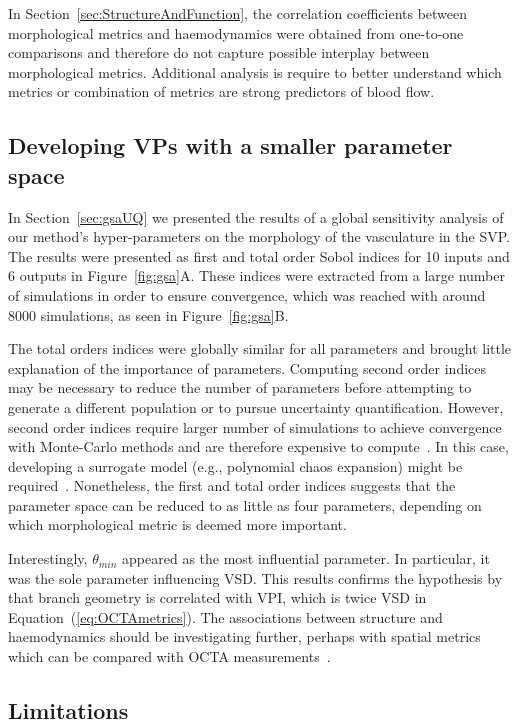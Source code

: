 \documentclass[11pt,]{article}
\begin{document}
In Section~\ref{sec:StructureAndFunction}, the correlation coefficients between morphological metrics and haemodynamics were obtained from one-to-one comparisons and therefore do not capture possible interplay between morphological metrics.
Additional analysis is require to better understand which metrics or combination of metrics are strong predictors of blood flow.

\subsection{Developing VPs with a smaller parameter space}\label{sec:disc-gsa}

In Section~\ref{sec:gsaUQ} we presented the results of a global sensitivity analysis of our method's hyper-parameters on the morphology of the vasculature in the SVP.
The results were presented as first and total order Sobol indices for 10 inputs and 6 outputs in Figure~\ref{fig:gsa}A.
These indices were extracted from a large number of simulations in order to ensure convergence, which was reached with around \SI{8000}{} simulations, as seen in Figure~\ref{fig:gsa}B.

The total orders indices were globally similar for all parameters and brought little explanation of the importance of parameters.
Computing second order indices may be necessary to reduce the number of parameters before attempting to generate a different population or to pursue uncertainty quantification.
However, second order indices require larger number of simulations to achieve convergence with Monte-Carlo methods and are therefore expensive to compute~\cite{Saltelli2008}.
In this case, developing a surrogate model (e.g., polynomial chaos expansion) might be required~\cite{Saltelli2008}.
Nonetheless, the first and total order indices suggests that the parameter space can be reduced to as little as four parameters, depending on which morphological metric is deemed more important.

Interestingly, $\theta_{min}$ appeared as the most influential parameter.
In particular, it was the sole parameter influencing VSD.
This results confirms the hypothesis by \cite{Yao_2020} that branch geometry is correlated with VPI, which is twice VSD in Equation~(\ref{eq:OCTAmetrics}).
The associations between structure and haemodynamics should be investigating further, perhaps with spatial metrics which can be compared with OCTA measurements~\cite{Yao_2020}.

\subsection{Limitations}\label{sec:disc-limitations}
\end{document}
